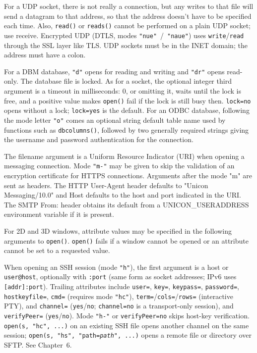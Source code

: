 For a UDP socket, there is not really a connection, but any writes to
that file will send a datagram to that address, so that the address
doesn't have to be specified each time. Also,
\texttt{read()} or \texttt{reads()} cannot be performed on a plain UDP
socket; use receive. Encrypted UDP (DTLS, modes \texttt{"nue"}~/~\texttt{"naue"})
uses \texttt{write}/\texttt{read} through the SSL layer like TLS.
UDP sockets must be in the INET domain; the
address must have a colon. 

For a DBM database, \texttt{"d"} opens for reading and writing and
\texttt{"dr"} opens read-only. The database file is locked. As for a
socket, the optional integer third argument is a timeout in
milliseconds: 0, or omitting it, waits until the lock is free, and a
positive value makes \texttt{open()} fail if the lock is still busy
then. \texttt{lock=no} opens without a lock; \texttt{lock=yes} is the
default.  For an ODBC database, following the mode
letter \texttt{"o"} comes an optional string default table name used
by functions such as \texttt{dbcolumns()}, followed by two generally
required strings giving the username and password authentication for the
connection.

The filename argument is a Uniform Resource Indicator (URI) when opening
a messaging connection. Mode \texttt{"m-"} may be given to skip the
validation of an encryption certificate for HTTPS connections.
Arguments after the mode "m" are sent as headers. The HTTP
User-Agent header defaults to "Unicon
Messaging/10.0" and Host defaults to the host and port
indicated in the URI. The SMTP From: header obtains its default from a
UNICON\_USERADDRESS environment variable if it is present.

For 2D and 3D windows, attribute values may be specified in the
following arguments to \texttt{open()}. \texttt{open()} fails if a
window cannot be opened or an attribute cannot be set to a requested
value.

When opening an SSH session (mode \texttt{"h"}), the first argument is a
host or \texttt{user@host}, optionally with \texttt{:port} (same form as
socket addresses; IPv6 uses \texttt{[addr]:port}). Trailing attributes
include \texttt{user=}, \texttt{key=}, \texttt{keypass=},
\texttt{password=}, \texttt{hostkeyfile=}, \texttt{cmd=} (requires mode
\texttt{"hc"}),
\texttt{term=}/\texttt{cols=}/\texttt{rows=} (interactive PTY), and
\texttt{channel=} (\texttt{yes}/\texttt{no}; \texttt{channel=no} is a
transport-only session), and \texttt{verifyPeer=} (\texttt{yes}/\texttt{no}).
Mode \texttt{"h-"} or \texttt{verifyPeer=no} skips host-key verification.
\texttt{open(s, "hc", ...)} on an existing SSH file opens another channel on
the same session; \texttt{open(s, "hs", "path=\textit{path}", ...)}
opens a remote file or directory over SFTP. See Chapter~6.

